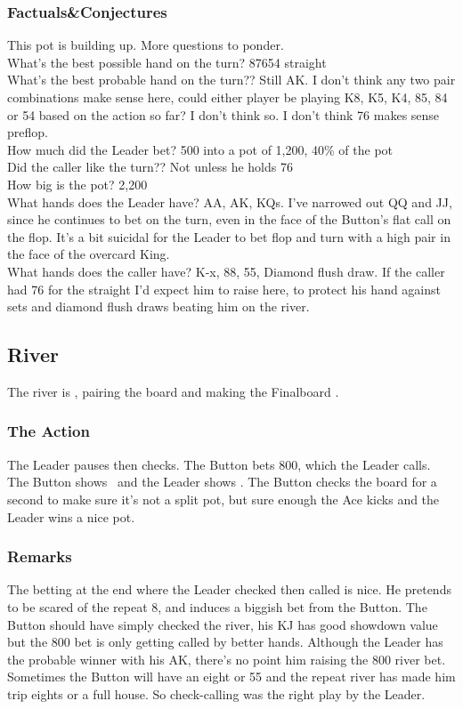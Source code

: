 \subsubsection*{Factuals\&Conjectures}

This pot is building up. More questions to ponder. \\
What's the best possible hand on the turn? 87654 straight \\
What's the best probable hand on the turn?? Still AK. I don't think any
two pair combinations make sense here, could either player be playing
K8, K5, K4, 85, 84 or 54 based on the action so far? I don't think so. I
don't think 76 makes sense preflop. \\
How much did the Leader bet? 500 into a pot of 1,200, 40\% of the pot \\
Did the caller like the turn?? Not unless he holds 76 \\
How big is the pot? 2,200 \\
What hands does the Leader have? AA, AK, KQs. I've narrowed out QQ and JJ,
since he continues to bet on the turn, even in the face of the Button's flat
call on the flop. It's a bit suicidal for the Leader to bet flop and
turn with a high pair in the face of the overcard King.\\
What hands does the caller have? K-x, 88, 55, Diamond flush draw. If
the caller had 76 for the straight I'd expect him to raise here, to
protect his hand against sets and diamond flush draws beating him on
the river.

\subsection*{River}
The river is \eigs, pairing the board and making
the Finalboard \Kc\eigd\fived\fours\eigs.

\subsubsection*{The Action}
The Leader pauses then checks. The Button bets 800, which the Leader calls.
The Button shows \Kd\Jc\ and the Leader shows \As\Ks. The Button
checks the board for a second to make sure it's not a split pot, but
sure enough the Ace kicks and the Leader wins a nice pot.

\subsubsection*{Remarks}
The betting at the end where the Leader checked then called is nice. He
pretends to be scared of the repeat 8, and induces a biggish bet from the
Button. The Button should have simply checked the river, his KJ has good
showdown value but the 800 bet is only getting called by better hands.
Although the Leader has the probable winner with his AK, there's no point
him raising the 800 river bet. Sometimes the Button will have an eight
or 55 and the repeat river has made him trip eights or a full house.
So check-calling was the right play by the Leader.

